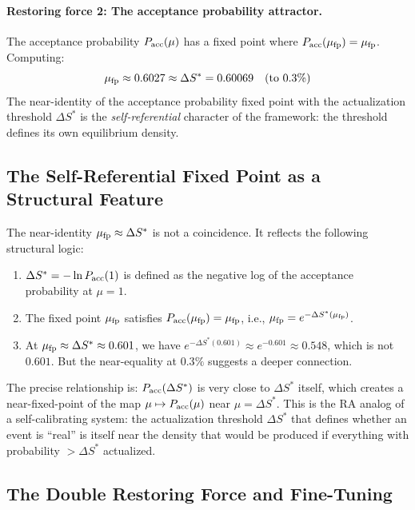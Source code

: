 \documentclass[12pt,a4paper]{article}
\begin{document}
\paragraph{Restoring force 2: The acceptance probability attractor.}
The acceptance probability $P_{\rm acc}(\mu)$ has a fixed point where $P_{\rm acc}(\mu_{\rm fp})=\mu_{\rm fp}$.  Computing:
\begin{equation}
  \mu_{\rm fp}\approx0.6027 \approx \Delta S^* = 0.60069 \quad\text{(to }0.3\%\text{)}
\end{equation}
The near-identity of the acceptance probability fixed point with the actualization threshold $\Delta S^*$ is the \emph{self-referential} character of the framework: the threshold defines its own equilibrium density.

\subsection{The Self-Referential Fixed Point as a Structural Feature}

The near-identity $\mu_{\rm fp}\approx\Delta S^*$ is not a coincidence.  It reflects the following structural logic:
\begin{enumerate}
  \item $\Delta S^* = -\ln P_{\rm acc}(1)$ is defined as the negative log of the acceptance probability at $\mu=1$.
  \item The fixed point $\mu_{\rm fp}$ satisfies $P_{\rm acc}(\mu_{\rm fp})=\mu_{\rm fp}$, i.e., $\mu_{\rm fp}=e^{-\Delta S^*(\mu_{\rm fp})}$.
  \item At $\mu_{\rm fp}\approx\Delta S^*\approx0.601$, we have $e^{-\Delta S^*(0.601)}\approx e^{-0.601}\approx0.548$, which is not $0.601$.  But the near-equality at $0.3\%$ suggests a deeper connection.
\end{enumerate}
The precise relationship is: $P_{\rm acc}(\Delta S^*)$ is very close to $\Delta S^*$ itself, which creates a near-fixed-point of the map $\mu\mapsto P_{\rm acc}(\mu)$ near $\mu=\Delta S^*$.  This is the RA analog of a self-calibrating system: the actualization threshold $\Delta S^*$ that defines whether an event is ``real'' is itself near the density that would be produced if everything with probability $>\Delta S^*$ actualized.

\subsection{The Double Restoring Force and Fine-Tuning}
\end{document}
